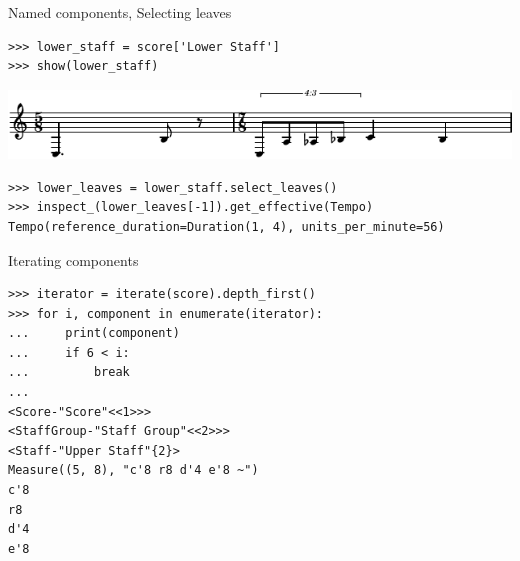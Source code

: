 \begin{frame}[fragile]{Named components, Selecting leaves}

\begin{abjadbookoutput}
\begin{singlespacing}
\vspace{-0.5\baselineskip}
\begin{verbatim}
>>> lower_staff = score['Lower Staff']
>>> show(lower_staff)
\end{verbatim}
\noindent\includegraphics[max width=\textwidth,]{assets/lilypond-186cde23c908e6e806ba5e607f61aec2.pdf}
\begin{verbatim}
>>> lower_leaves = lower_staff.select_leaves()
>>> inspect_(lower_leaves[-1]).get_effective(Tempo)
Tempo(reference_duration=Duration(1, 4), units_per_minute=56)
\end{verbatim}
\end{singlespacing}
\end{abjadbookoutput}

\end{frame}

\begin{frame}[fragile]{Iterating components}

\begin{abjadbookoutput}
\begin{singlespacing}
\vspace{-0.5\baselineskip}
\begin{verbatim}
>>> iterator = iterate(score).depth_first()
>>> for i, component in enumerate(iterator):
...     print(component)
...     if 6 < i:
...         break
...
<Score-"Score"<<1>>>
<StaffGroup-"Staff Group"<<2>>>
<Staff-"Upper Staff"{2}>
Measure((5, 8), "c'8 r8 d'4 e'8 ~")
c'8
r8
d'4
e'8
\end{verbatim}
\end{singlespacing}
\end{abjadbookoutput}

\end{frame}


